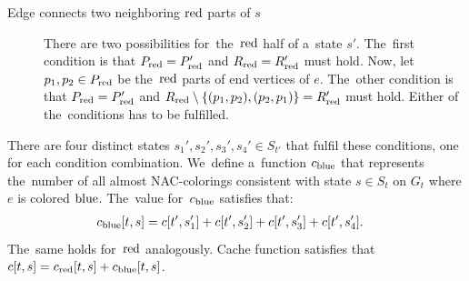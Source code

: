 \begin{lemma}
\begin{description}
		\item[Edge connects two neighboring \( \text{red} \) parts of \( s \)]
		      There are two possibilities for~the~\( \text{red} \) half of a~state \( s' \).
		      The~first condition is that \( P_{\text{red}} = P_{\text{red}}' \)
		      and \( R_{\text{red}} = R_{\text{red}}' \) must hold.
		      Now, let~\( p_1, p_2 \in P_{\text{red}} \) be the~\( \text{red} \) parts
		      of end vertices of \( e \).
		      The~other condition is that \( P_{\text{red}} = P_{\text{red}}' \) and
		      \( R_{\text{red}} \setminus \{(p_{1}, p_{2}), (p_{2}, p_{1})\} = R_{\text{red}}' \) must hold.
		      Either of the~conditions has to be fulfilled.

	\end{description}
	There are four distinct states \( s_1', s_2', s_3', s_4' \in S_{t'} \)
	that fulfil these conditions, one for each condition combination.
	We~define a~function \( c_{\text{blue}} \) that represents
	the~number of all almost NAC-colorings
	consistent with state \( s \in S_t \) on \( G_t \)
	where \( e \) is colored \( \text{blue} \).
	The~value for~\( c_{\text{blue}} \) satisfies that:
	\begin{align*}
		c_{\text{blue}}[t, s] & = c[t', s_1'] + c[t', s_2'] + c[t', s_3'] + c[t', s_4'].
	\end{align*}
	The~same holds for~\( \text{red} \) analogously.
	Cache function satisfies that  \( c[t, s] = c_{\text{red}}[t, s] + c_{\text{blue}}[t, s] \).
\end{lemma}
%
